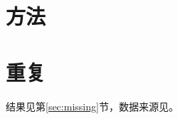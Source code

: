 \section{方法}\label{sec:method}
\section{重复}\label{sec:method}
结果见第\ref{sec:missing}节，数据来源见\cite{missing2024}。
